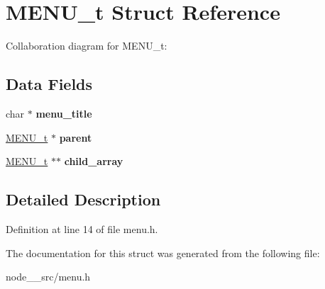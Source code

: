 \hypertarget{structMENU__t}{}\section{M\+E\+N\+U\+\_\+t Struct Reference}
\label{structMENU__t}


Collaboration diagram for M\+E\+N\+U\+\_\+t\+:
\subsection*{Data Fields}
\begin{DoxyCompactItemize}
\item 
char $\ast$ {\bfseries menu\+\_\+title}\hypertarget{structMENU__t_a8d8d5a2fe058ac75a63f344a493d4a9c}{}\label{structMENU__t_a8d8d5a2fe058ac75a63f344a493d4a9c}

\item 
\hyperlink{structMENU__t}{M\+E\+N\+U\+\_\+t} $\ast$ {\bfseries parent}\hypertarget{structMENU__t_a86db73e34de9646a5bcd4f841d3a2af4}{}\label{structMENU__t_a86db73e34de9646a5bcd4f841d3a2af4}

\item 
\hyperlink{structMENU__t}{M\+E\+N\+U\+\_\+t} $\ast$$\ast$ {\bfseries child\+\_\+array}\hypertarget{structMENU__t_af9f9460341997e36b109a8b6d33c62bb}{}\label{structMENU__t_af9f9460341997e36b109a8b6d33c62bb}

\end{DoxyCompactItemize}


\subsection{Detailed Description}


Definition at line 14 of file menu.\+h.



The documentation for this struct was generated from the following file\+:\begin{DoxyCompactItemize}
\item 
node\+\_\+\_\+src/menu.\+h\end{DoxyCompactItemize}
